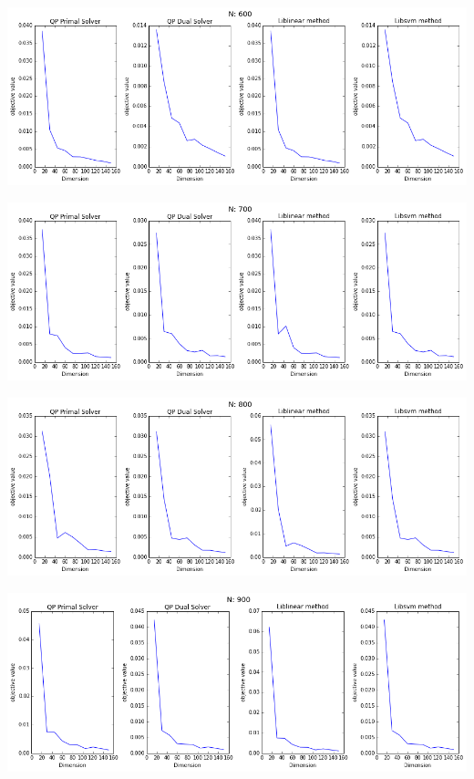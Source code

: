 \documentclass[12pt, a4paper]{article}
\begin{document}
			\begin{center}
				\includegraphics[width=18cm]{1par_obj_N600.png}
			\end{center}

			\begin{center}
				\includegraphics[width=18cm]{1par_obj_N700.png}
			\end{center}

			\begin{center}
				\includegraphics[width=18cm]{1par_obj_N800.png}
			\end{center}

			\begin{center}
				\includegraphics[width=18cm]{1par_obj_N900.png}
			\end{center}
\end{document}
